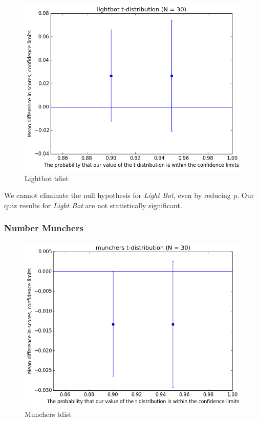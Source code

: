 				\begin{figure}[] 
					\centering 
					\includegraphics[width=\textwidth, height=.4\textheight, keepaspectratio=true]{lightbot_tdist.png} 
					\caption{Lightbot tdist}
				\end{figure}

				We cannot eliminate the null hypothesis for \textit{Light Bot}, even by reducing p. Our quiz results for \textit{Light Bot} are not statistically significant.

			\subsubsection{Number Munchers}

				\begin{figure}[] 
					\centering 
					\includegraphics[width=\textwidth, height=.4\textheight, keepaspectratio=true]{munchers_tdist.png} 
					\caption{Munchers tdist}
				\end{figure}


